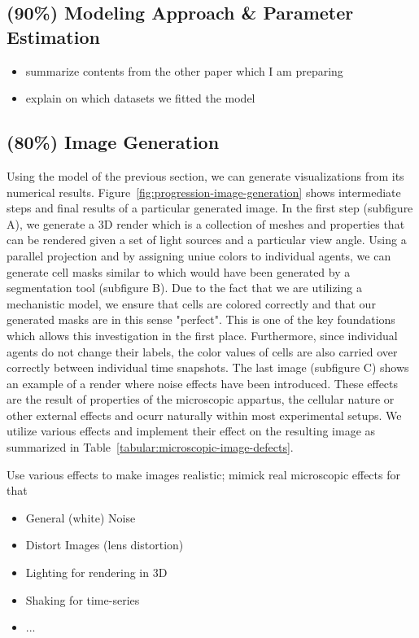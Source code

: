 \documentclass{article}
\begin{document}
\subsection{(90\%) Modeling Approach \& Parameter Estimation}

\begin{itemize}
    \item summarize contents from the other paper which I am preparing
    \item explain on which datasets we fitted the model
\end{itemize}

\subsection{(80\%) Image Generation}
Using the model of the previous section, we can generate visualizations from its numerical results.
Figure~\ref{fig:progression-image-generation} shows intermediate steps and final results of a
particular generated image.
In the first step (subfigure A), we generate a 3D render which is a collection of meshes and
properties that can be rendered given a set of light sources and a particular view angle.
Using a parallel projection and by assigning uniue colors to individual agents, we can generate cell
masks similar to which would have been generated by a segmentation tool (subfigure B).
Due to the fact that we are utilizing a mechanistic model, we ensure that cells are colored
correctly and that our generated masks are in this sense "perfect".
This is one of the key foundations which allows this investigation in the first place.
Furthermore, since individual agents do not change their labels, the color values of cells are also
carried over correctly between individual time snapshots.
The last image (subfigure C) shows an example of a render where noise effects have been introduced.
These effects are the result of properties of the microscopic appartus, the cellular nature or other
external effects and ocurr naturally within most experimental setups.
We utilize various effects and implement their effect on the resulting image as summarized in
Table~\ref{tabular:microscopic-image-defects}.

Use various effects to make images realistic; mimick real microscopic effects for that
\begin{itemize}
    \item General (white) Noise
    \item Distort Images (lens distortion)
    \item Lighting for rendering in 3D
    \item Shaking for time-series
    \item ...
\end{itemize}
\end{document}
